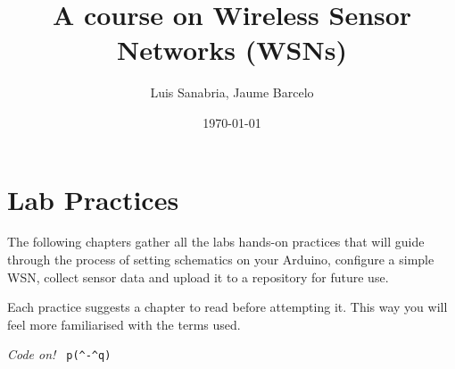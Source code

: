 \documentclass[12pt]{book}
\begin{document}
\frontmatter
\pagestyle{empty}
\title{\textbf{A course on Wireless Sensor Networks (WSNs)}}
\author{Luis Sanabria, Jaume Barcelo}
\date{\today}
\maketitle
%
\tableofcontents
%
\mainmatter
%



%


\chapter*{Lab Practices}\label{practices}

The following chapters gather all the labs hands-on practices that will guide through the process of setting schematics on your Arduino, configure a simple WSN, collect sensor data and upload it to a repository for future use.

Each practice suggests a chapter to read before attempting it. This way you will feel more familiarised with the terms used.

\emph{Code on!} \verb! p(^-^q)!


	
	
	
	
	
    
    
    
    
    
    
    
    
    \backmatter
%


\end{document}
